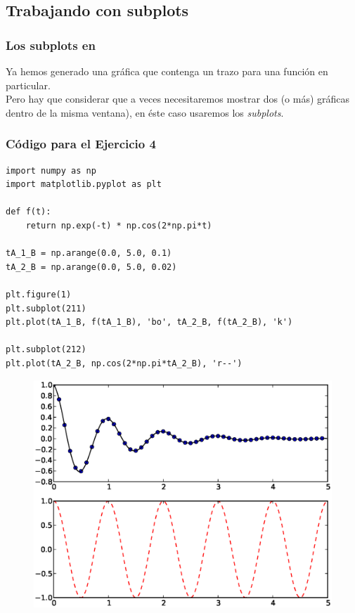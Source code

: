 \subsection{Trabajando con subplots}
\begin{frame}
\frametitle{Los subplots en \python}
Ya hemos generado una gráfica que contenga un trazo para una función en particular.
\\
\bigskip
Pero hay que considerar que a veces necesitaremos mostrar dos (o más) gráficas dentro de la misma ventana), en éste caso usaremos los \emph{subplots}.
\end{frame}
\begin{frame}
\frametitle{Código para el Ejercicio 4}
\begin{lstlisting}[style=codigopython]
import numpy as np
import matplotlib.pyplot as plt

def f(t):
    return np.exp(-t) * np.cos(2*np.pi*t)

tA_1_B = np.arange(0.0, 5.0, 0.1)
tA_2_B = np.arange(0.0, 5.0, 0.02)

plt.figure(1)
plt.subplot(211)
plt.plot(tA_1_B, f(tA_1_B), 'bo', tA_2_B, f(tA_2_B), 'k')

plt.subplot(212)
plt.plot(tA_2_B, np.cos(2*np.pi*tA_2_B), 'r--')
\end{lstlisting}
\end{frame}
\begin{frame}[fragile]
\begin{figure}
	\centering
	\includegraphics[scale=0.5]{Imagenes/plotEjercicio4.eps}
\end{figure}
\end{frame}
